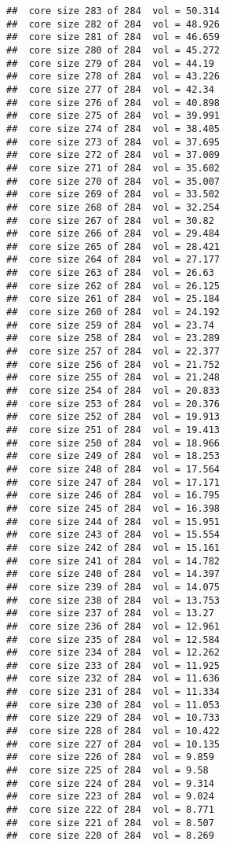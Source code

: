 \documentclass[
]{article}
\begin{document}
\begin{verbatim}
##  core size 283 of 284  vol = 50.314 
##  core size 282 of 284  vol = 48.926 
##  core size 281 of 284  vol = 46.659 
##  core size 280 of 284  vol = 45.272 
##  core size 279 of 284  vol = 44.19 
##  core size 278 of 284  vol = 43.226 
##  core size 277 of 284  vol = 42.34 
##  core size 276 of 284  vol = 40.898 
##  core size 275 of 284  vol = 39.991 
##  core size 274 of 284  vol = 38.405 
##  core size 273 of 284  vol = 37.695 
##  core size 272 of 284  vol = 37.009 
##  core size 271 of 284  vol = 35.602 
##  core size 270 of 284  vol = 35.007 
##  core size 269 of 284  vol = 33.502 
##  core size 268 of 284  vol = 32.254 
##  core size 267 of 284  vol = 30.82 
##  core size 266 of 284  vol = 29.484 
##  core size 265 of 284  vol = 28.421 
##  core size 264 of 284  vol = 27.177 
##  core size 263 of 284  vol = 26.63 
##  core size 262 of 284  vol = 26.125 
##  core size 261 of 284  vol = 25.184 
##  core size 260 of 284  vol = 24.192 
##  core size 259 of 284  vol = 23.74 
##  core size 258 of 284  vol = 23.289 
##  core size 257 of 284  vol = 22.377 
##  core size 256 of 284  vol = 21.752 
##  core size 255 of 284  vol = 21.248 
##  core size 254 of 284  vol = 20.833 
##  core size 253 of 284  vol = 20.376 
##  core size 252 of 284  vol = 19.913 
##  core size 251 of 284  vol = 19.413 
##  core size 250 of 284  vol = 18.966 
##  core size 249 of 284  vol = 18.253 
##  core size 248 of 284  vol = 17.564 
##  core size 247 of 284  vol = 17.171 
##  core size 246 of 284  vol = 16.795 
##  core size 245 of 284  vol = 16.398 
##  core size 244 of 284  vol = 15.951 
##  core size 243 of 284  vol = 15.554 
##  core size 242 of 284  vol = 15.161 
##  core size 241 of 284  vol = 14.782 
##  core size 240 of 284  vol = 14.397 
##  core size 239 of 284  vol = 14.075 
##  core size 238 of 284  vol = 13.753 
##  core size 237 of 284  vol = 13.27 
##  core size 236 of 284  vol = 12.961 
##  core size 235 of 284  vol = 12.584 
##  core size 234 of 284  vol = 12.262 
##  core size 233 of 284  vol = 11.925 
##  core size 232 of 284  vol = 11.636 
##  core size 231 of 284  vol = 11.334 
##  core size 230 of 284  vol = 11.053 
##  core size 229 of 284  vol = 10.733 
##  core size 228 of 284  vol = 10.422 
##  core size 227 of 284  vol = 10.135 
##  core size 226 of 284  vol = 9.859 
##  core size 225 of 284  vol = 9.58 
##  core size 224 of 284  vol = 9.314 
##  core size 223 of 284  vol = 9.024 
##  core size 222 of 284  vol = 8.771 
##  core size 221 of 284  vol = 8.507 
##  core size 220 of 284  vol = 8.269 

\end{verbatim}
\end{document}
